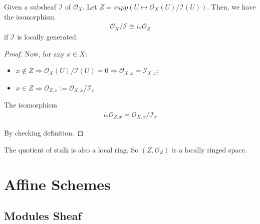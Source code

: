 \documentclass[Total.tex]{subfiles}
\begin{document}
				\begin{proposition}
					Given a subsheaf $\mathcal{I}$ of $\mathcal{O}_X$. Let $Z=supp(U\mapsto \mathcal{O}_X(U)/\mathcal{I}(U))$. Then, we have the isomorphism
					\begin{gather*}
						\mathcal{O}_X/\mathcal{I}\cong i_*\mathcal{O}_Z
					\end{gather*}
					if $\mathcal{I}$ is locally generated. 
				\end{proposition}
				\begin{proof}
					Now, for any $x\in X$:
					\begin{itemize}
						\item $x\notin Z\Rightarrow \mathcal{O}_X(U)/\mathcal{I}(U)=0\Rightarrow \mathcal{O}_{X,x}=\mathcal{I}_{X,x}$;
						\item $x\in Z\Rightarrow \mathcal{O}_{Z,x}:=\mathcal{O}_{X,x}/\mathcal{I}_x$
					\end{itemize}
					
					The isomorphism
					\begin{gather*}
						i_*\mathcal{O}_{Z,x}=\mathcal{O}_{X,x}/\mathcal{I}_x
					\end{gather*}
					
					By checking definition.
				\end{proof}
				
				The quotient of stalk is also a local ring. So $(Z,\mathcal{O}_Z)$ is a locally ringed space.
		\section{Affine Schemes}
		\subsection{Modules Sheaf}
			
\end{document}
